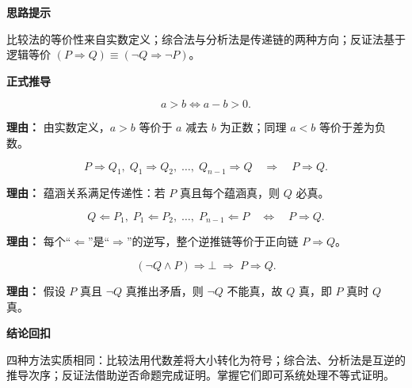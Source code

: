 \begin{proofbox}

	\textbf{\textcolor{CProof}{思路提示}}

	比较法的等价性来自实数定义；综合法与分析法是传递链的两种方向；反证法基于逻辑等价 $(P\Rightarrow Q) \equiv (\neg Q \Rightarrow \neg P)$。

	\medskip
	\textbf{\textcolor{CProof}{正式推导}}
	\begin{description}[style=nextline, leftmargin=2.8em, labelsep=0.5em, itemsep=0.55em]
		\item[\textbf{步骤一（比较法等价）：}]
			\[
				a>b \Longleftrightarrow a-b>0.
			\]
			\par\textbf{理由：}
			由实数定义，$a>b$ 等价于 $a$ 减去 $b$ 为正数；同理 $a<b$ 等价于差为负数。

		\item[\textbf{步骤二（综合法链式传递）：}]
			\[
				P \Rightarrow Q_1,\; Q_1 \Rightarrow Q_2,\; \dots,\; Q_{n-1} \Rightarrow Q \quad\Longrightarrow\quad P \Rightarrow Q.
			\]
			\par\textbf{理由：}
			蕴涵关系满足传递性：若 $P$ 真且每个蕴涵真，则 $Q$ 必真。

		\item[\textbf{步骤三（分析法逆推）：}]
			\[
				Q \Leftarrow P_1,\; P_1 \Leftarrow P_2,\; \dots,\; P_{n-1} \Leftarrow P \quad\Longleftrightarrow\quad P \Rightarrow Q.
			\]
			\par\textbf{理由：}
			每个“$\Leftarrow$”是“$\Rightarrow$”的逆写，整个逆推链等价于正向链 $P\Rightarrow Q$。

		\item[\textbf{步骤四（反证法矛盾）：}]
			\[
				(\neg Q \land P) \Rightarrow \bot \;\Longrightarrow\; P \Rightarrow Q.
			\]
			\par\textbf{理由：}
			假设 $P$ 真且 $\neg Q$ 真推出矛盾，则 $\neg Q$ 不能真，故 $Q$ 真，即 $P$ 真时 $Q$ 真。
	\end{description}

	\medskip
	\textbf{\textcolor{CProof}{结论回扣}}

	四种方法实质相同：比较法用代数差将大小转化为符号；综合法、分析法是互逆的推导次序；反证法借助逆否命题完成证明。掌握它们即可系统处理不等式证明。
\end{proofbox}
